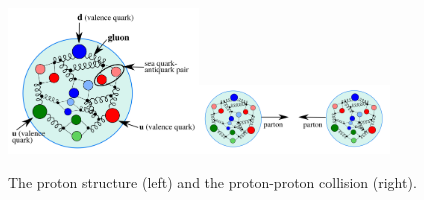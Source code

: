 \begin{figure}[htb]
  \begin{center}
    {\includegraphics[width=0.45\textwidth]{../figs/Intro/protonStructure.png}\includegraphics[width=0.45\textwidth]{../figs/Intro/ppCollision.png}}
    \caption{The proton structure (left) and the proton-proton collision (right).}
    \label{fig:ppCollision}
  \end{center}
\end{figure}

